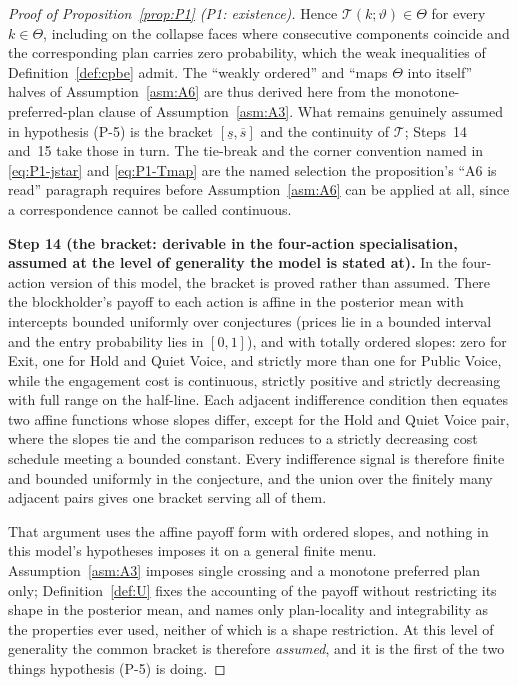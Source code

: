 \documentclass[11pt]{article}
\newcommand{\Tmap}{\mathcal{T}}
\begin{document}
\begin{proof}[Proof of Proposition~\ref{prop:P1} (P1: existence)]
Hence $\Tmap(k;\vartheta) \in \Theta$ for every $k \in \Theta$, including on the collapse faces where
consecutive components coincide and the corresponding plan carries zero probability, which the
weak inequalities of Definition~\ref{def:cpbe} admit. The ``weakly ordered'' and ``maps $\Theta$ into
itself'' halves of Assumption~\ref{asm:A6} are thus derived here from the monotone-preferred-plan
clause of Assumption~\ref{asm:A3}. What remains genuinely assumed in hypothesis (P-5) is the bracket
$[\underline s,\overline s]$ and the continuity of $\Tmap$; Steps~14 and~15 take those in turn. The
tie-break and the corner convention named in \eqref{eq:P1-jstar} and \eqref{eq:P1-Tmap} are the named
selection the proposition's ``A6 is read'' paragraph requires before
Assumption~\ref{asm:A6} can be applied at all, since a correspondence cannot be called continuous.

\smallskip
\noindent\textbf{Step 14 (the bracket: derivable in the four-action specialisation, assumed at the
level of generality the model is stated at).}
In the four-action version of this model, the bracket is proved rather than assumed. There the
blockholder's payoff to each action is affine in the posterior mean with intercepts bounded uniformly
over conjectures (prices lie in a bounded interval and the entry probability lies in $[0,1]$),
and with totally ordered slopes: zero for Exit, one for Hold and Quiet Voice, and strictly more than
one for Public Voice, while the engagement cost is continuous, strictly positive and strictly
decreasing with full range on the half-line. Each adjacent indifference condition then equates two
affine functions whose slopes differ, except for the Hold and Quiet Voice pair, where the slopes tie
and the comparison reduces to a strictly decreasing cost schedule meeting a bounded constant. Every
indifference signal is therefore finite and bounded uniformly in the conjecture, and the union over
the finitely many adjacent pairs gives one bracket serving all of them.

That argument uses the affine payoff form with ordered slopes, and nothing in this model's
hypotheses imposes it on a general finite menu. Assumption~\ref{asm:A3} imposes single crossing and a
monotone preferred plan only; Definition~\ref{def:U} fixes the accounting of the payoff without
restricting its shape in the posterior mean, and names only plan-locality and integrability as the
properties ever used, neither of which is a shape restriction. At this level of generality the common
bracket is therefore \emph{assumed}, and it is the first of the two things hypothesis (P-5) is doing.


\end{proof}
\end{document}
